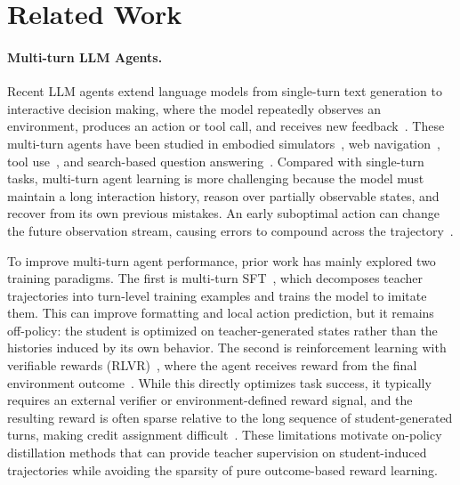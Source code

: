 \section{Related Work}
\label{sec:related_work}

\paragraph{Multi-turn LLM Agents.}
Recent LLM agents extend language models from single-turn text generation to interactive decision making, where the model repeatedly observes an environment, produces an action or tool call, and receives new feedback~\citep{yao2022react, yang2024swe, zhou2025mixture, chan2025mle, chen2025scaling, zhou2026synthetic}.
%
These multi-turn agents have been studied in embodied simulators~\citep{shridhar2020alfworld}, web navigation~\citep{gur2024real, team2025tongyi}, tool use~\citep{yao2024tau}, and search-based question answering~\citep{jin2025search}. 
%
Compared with single-turn tasks, multi-turn agent learning is more challenging because the model must maintain a long interaction history, reason over partially observable states, and recover from its own previous mistakes. 
%
An early suboptimal action can change the future observation stream, causing errors to compound across the trajectory~\citep{zhang2025agentracer}.
%

To improve multi-turn agent performance, prior work has mainly explored two training paradigms. 
%
The first is multi-turn SFT~\citep{teng2024fine, li2025beyond, zhou2025mixture}, which decomposes teacher trajectories into turn-level training examples and trains the model to imitate them. 
%
This can improve formatting and local action prediction, but it remains off-policy: the student is optimized on teacher-generated states rather than the histories induced by its own behavior. 
%
The second is reinforcement learning with verifiable rewards (RLVR)~\citep{shao2024deepseekmath, zhou2025disco, yang2025let}, where the agent receives reward from the final environment outcome~\citep{deepswe2025, wei2025webagent}. 
%
While this directly optimizes task success, it typically requires an external verifier or environment-defined reward signal, and the resulting reward is often sparse relative to the long sequence of student-generated turns, making credit assignment difficult~\citep{wang2026openclaw}. 
%
These limitations motivate on-policy distillation methods that can provide teacher supervision on student-induced trajectories while avoiding the sparsity of pure outcome-based reward learning.
%


